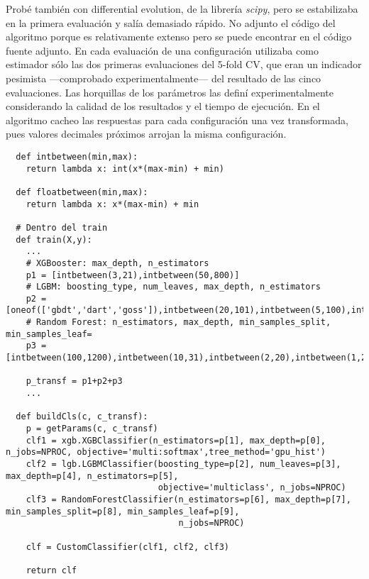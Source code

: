 \documentclass{article}
\begin{document}
Probé también con differential evolution, de la librería \textit{scipy}, pero se estabilizaba en la primera evaluación y salía demasiado rápido. No adjunto el código del algoritmo porque es relativamente extenso pero se puede encontrar en el código fuente adjunto. En cada evaluación de una configuración utilizaba como estimador sólo las dos primeras evaluaciones del 5-fold CV, que eran un indicador pesimista ---comprobado experimentalmente--- del resultado de las cinco evaluaciones. Las horquillas de los parámetros las definí experimentalmente considerando la calidad de los resultados y el tiempo de ejecución. En el algoritmo cacheo las respuestas para cada configuración una vez transformada, pues valores decimales próximos arrojan la misma configuración.

\begin{verbatim}
  def intbetween(min,max):
    return lambda x: int(x*(max-min) + min)

  def floatbetween(min,max):
    return lambda x: x*(max-min) + min
    
  # Dentro del train
  def train(X,y):
    ...
    # XGBooster: max_depth, n_estimators
    p1 = [intbetween(3,21),intbetween(50,800)]
    # LGBM: boosting_type, num_leaves, max_depth, n_estimators
    p2 = [oneof(['gbdt','dart','goss']),intbetween(20,101),intbetween(5,100),intbetween(200,1500)]
    # Random Forest: n_estimators, max_depth, min_samples_split, min_samples_leaf=
    p3 = [intbetween(100,1200),intbetween(10,31),intbetween(2,20),intbetween(1,20)]
    
    p_transf = p1+p2+p3
    ...
    
  def buildCls(c, c_transf):
    p = getParams(c, c_transf)
    clf1 = xgb.XGBClassifier(n_estimators=p[1], max_depth=p[0], n_jobs=NPROC, objective='multi:softmax',tree_method='gpu_hist')
    clf2 = lgb.LGBMClassifier(boosting_type=p[2], num_leaves=p[3], max_depth=p[4], n_estimators=p[5],
                              objective='multiclass', n_jobs=NPROC)
    clf3 = RandomForestClassifier(n_estimators=p[6], max_depth=p[7], min_samples_split=p[8], min_samples_leaf=p[9],
                                  n_jobs=NPROC)

    clf = CustomClassifier(clf1, clf2, clf3)

    return clf
\end{verbatim}
\end{document}
